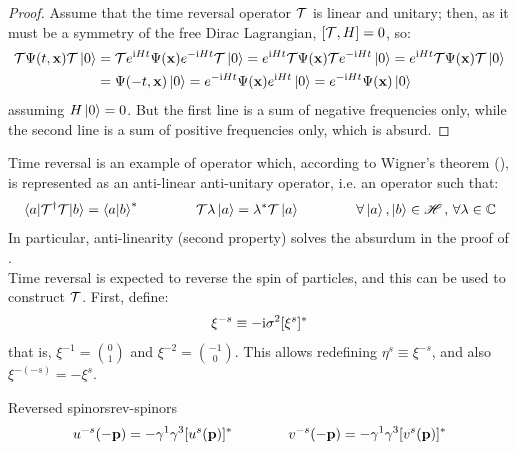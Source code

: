 \begin{proofbox}
  \begin{proof}
    Assume that the time reversal operator $ \mathcal{T} $ is linear and unitary; then, as it must be a symmetry of the free Dirac Lagrangian, $ [\mathcal{T} , H] = 0 $, so:
    \begin{equation*}
      \begin{split}
        \mathcal{T} \Psi(t,\mathbf{x}) \mathcal{T} \ket{0}
        &= \mathcal{T} e^{\mathrm{i} H t} \Psi(\mathbf{x}) e^{-\mathrm{i} H t} \mathcal{T} \ket{0} = e^{\mathrm{i} H t} \mathcal{T} \Psi(\mathbf{x}) \mathcal{T} e^{-\mathrm{i} H t} \ket{0} = e^{\mathrm{i} H t} \mathcal{T} \Psi(\mathbf{x}) \mathcal{T} \ket{0} \\
        &= \Psi(-t,\mathbf{x}) \ket{0} = e^{-\mathrm{i} H t} \Psi(\mathbf{x}) e^{\mathrm{i} H t} \ket{0} = e^{-\mathrm{i} H t} \Psi(\mathbf{x}) \ket{0}
      \end{split}
    \end{equation*}
    assuming $ H \ket{0} = 0 $. But the first line is a sum of negative frequencies only, while the second line is a sum of positive frequencies only, which is absurd.
  \end{proof}
\end{proofbox}

Time reversal is an example of operator which, according to Wigner's theorem (), is represented as an anti-linear anti-unitary operator, i.e. an operator such that:
\begin{equation*}
  \braket{a | \mathcal{T}^\dagger \mathcal{T} | b} = \braket{a | b}^*
  \qquad \qquad
  \mathcal{T} \lambda \ket{a} = \lambda^* \mathcal{T} \ket{a}
  \qquad \qquad
  \forall \ket{a},\ket{b} \in \mathscr{H}\,,\,\forall \lambda \in \mathbb{C}
\end{equation*}
In particular, anti-linearity (second property) solves the absurdum in the proof of .\\
Time reversal is expected to reverse the spin of particles, and this can be used to construct $ \mathcal{T} $. First, define:
\begin{equation}
  \xi^{-s} \equiv -\mathrm{i} \sigma^2 [\xi^s]^*
\end{equation}
that is, $ \xi^{-1} = \binom{0}{1} $ and $ \xi^{-2} = \binom{-1}{0} $. This allows redefining $ \eta^s \equiv \xi^{-s} $, and also $ \xi^{-(-s)} = - \xi^s $.

\begin{lemma}[before upper = {\tcbtitle}]{Reversed spinors}{rev-spinors}
  \begin{equation}
    u^{-s}(-\mathbf{p}) = - \gamma^1 \gamma^3 [u^s(\mathbf{p})]^*
    \qquad \qquad
    v^{-s}(-\mathbf{p}) = - \gamma^1 \gamma^3 [v^s(\mathbf{p})]^*
  \end{equation}
\end{lemma}

